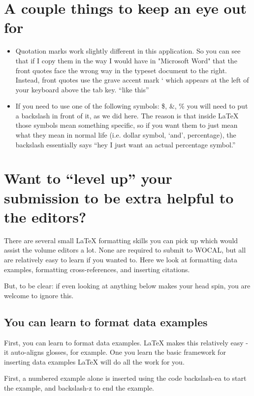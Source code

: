 \documentclass[output=paper,colorlinks,citecolor=brown,
]{langscibook}
\begin{document}
\section{A couple things to keep an eye out for}

\begin{itemize}
\item Quotation marks work slightly different in this application. So you can see that if I copy them in the way I would have in "Microsoft Word" that the front quotes face the wrong way in the typeset document to the right. Instead, front quotes use the grave accent mark ` which appears at the left of your keyboard above the tab key. ``like this''
\item If you need to use one of the following symbols:  \$, \&, \%  you will need to put a backslash in front of it, as we did here. The reason is that inside LaTeX those symbols mean something specific, so if you want them to just mean what they mean in normal life (i.e. dollar symbol, `and', percentage), the backslash essentially says ``hey I just want an actual percentage symbol.”  
\end{itemize}


\section{Want to ``level up'' your submission to be extra helpful to the editors?}

There are several small LaTeX formatting skills you can pick up which would assist the volume editors a lot. None are required to submit to WOCAL, but all are relatively easy to learn if you wanted to. Here we look at formatting data examples, formatting cross-references, and inserting citations.

But, to be clear: if even looking at anything below makes your head spin, you are welcome to ignore this. 

\subsection{You can learn to format data examples}

First, you can learn to format data examples. LaTeX makes this relatively easy - it auto-aligns glosses, for example. One you learn the basic framework for inserting data examples LaTeX will do all the work for you. 

First, a numbered example alone is inserted using the code backslash-ea to start the example, and backslash-z to end the example.
\end{document}
